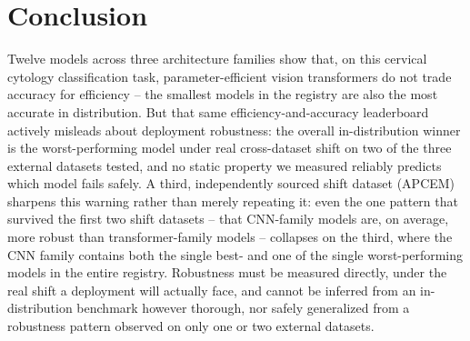 \documentclass[runningheads]{llncs}
\begin{document}
\section{Conclusion}

Twelve models across three architecture families show that, on this
cervical cytology classification task, parameter-efficient vision
transformers do not trade accuracy for efficiency -- the smallest models
in the registry are also the most accurate in distribution. But that same
efficiency-and-accuracy leaderboard actively misleads about deployment
robustness: the overall in-distribution winner is the worst-performing
model under real cross-dataset shift on two of the three external datasets
tested, and no static property we measured reliably predicts which model
fails safely. A third, independently sourced shift dataset (APCEM)
sharpens this warning rather than merely repeating it: even the one
pattern that survived the first two shift datasets -- that CNN-family
models are, on average, more robust than transformer-family models --
collapses on the third, where the CNN family contains both the single
best- and one of the single worst-performing models in the entire
registry. Robustness must be measured directly, under the real shift a
deployment will actually face, and cannot be inferred from an
in-distribution benchmark however thorough, nor safely generalized from a
robustness pattern observed on only one or two external datasets.
\end{document}
